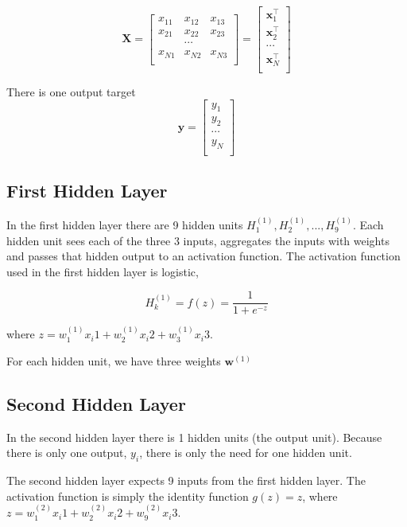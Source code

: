 \documentclass[11pt]{article}%
\begin{document}
	$$
	\mathbf{X} = \begin{bmatrix}
	x_{11} & x_{12} & x_{13} \\
	x_{21} & x_{22} & x_{23} \\
	 & \cdots & \\
	x_{N1} & x_{N2} & x_{N3} \\
	\end{bmatrix} = 
	\begin{bmatrix}
	\mathbf{x}^\intercal_1 \\
	\mathbf{x}^\intercal_2 \\
	 \cdots \\
	\mathbf{x}^\intercal_N \\
	\end{bmatrix}
	$$

	There is one output target 
	$$
	\mathbf{y} = \begin{bmatrix}
	y_1 \\
	y_2 \\
 	 \cdots \\
 	y_N \\
	\end{bmatrix}
	$$
	

\subsection{First Hidden Layer}

	In the first hidden layer there are 9 hidden units $H^{(1)}_1, H^{(1)}_2, ..., H^{(1)}_9$. Each hidden unit sees each of the three 3 inputs, aggregates the inputs with weights and passes that hidden output to an activation function. The activation function used in the first hidden layer is logistic,
	
	$$
	H^{(1)}_k = f(z) = \frac{1}{1 + e^{-z}}
	$$
	
	where $z = w^{(1)}_1 x_i1 + w^{(1)}_2 x_i2 + w^{(1)}_3 x_i3$.
	
	For each hidden unit, we have three weights $\mathbf{w}^{(1)}$

\subsection{Second Hidden Layer}

	In the second hidden layer there is 1 hidden units (the output unit). Because there is only one output, $y_i$, there is only the need for one hidden unit. 
	
	The second hidden layer expects 9 inputs from the first hidden layer. The activation function is simply the identity function $g(z) = z$, where $z = w^{(2)}_1 x_i1 + w^{(2)}_2 x_i2 + w^{(2)}_9 x_i3$.
	
\end{document}
